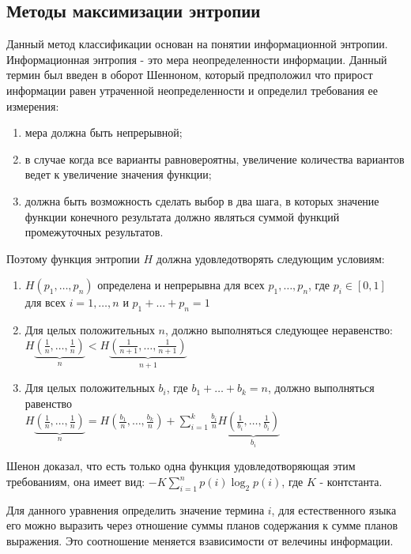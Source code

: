 \documentclass{standalone}
\begin{document}
\subsection{Методы максимизации энтропии} %
\par Данный метод классификации основан на понятии информационной энтропии. Информационная энтропия - это мера неопределенности информации. Данный термин был введен в оборот Шенноном, который предположил что прирост информации равен утраченной неопределенности и определил требования ее измерения:
\begin{enumerate}
    \item мера должна быть непрерывной;
    \item в случае когда все варианты равновероятны, увеличение количества вариантов ведет к увеличение значения функции;
    \item должна быть возможность сделать выбор в два шага, в которых значение функции конечного результата должно являться суммой функций промежуточных результатов.
\end{enumerate}
\par Поэтому функция энтропии \(H\) должна удовледотворять следующим условиям:
\begin{enumerate}
    \item \(H(p_{1},\ldots,p_{n})\) определена и непрерывна для всех \(p_{1},\ldots,p_{n}\), где \(p_{i}\in [0,1]\) для всех \(i=1,\ldots,n\) и \(p_{1}+\ldots +p_{n}=1\)
    \item Для целых положительных \(n\), должно выполняться следующее неравенство:
        \(H\underbrace {\left({\frac {1}{n}},\ldots,{\frac {1}{n}}\right)} _{n}<H\underbrace {\left({\frac {1}{n+1}},\ldots,{\frac {1}{n+1}}\right)} _{n+1}\)
    \item Для целых положительных \(b_{i}\), где \(b_{1}+\ldots+b_{k}=n\), должно выполняться равенство \\
        \(H\underbrace {\left({\frac {1}{n}},\ldots,{\frac {1}{n}}\right)} _{n}=H\left({\frac {b_{1}}{n}},\ldots ,{\frac {b_{k}}{n}}\right)+\sum _{i=1}^{k}{\frac {b_{i}}{n}}H\underbrace {\left({\frac {1}{b_{i}}},\ldots,{\frac {1}{b_{i}}}\right)} _{b_{i}}\)
\end{enumerate}
\par Шенон доказал, что есть только одна функция удовледотворяющая этим требованиям, она имеет вид:
\(-K\sum _{{i=1}}^{n}p(i)\log _{2}p(i)\),
где \(K\) - контстанта.
\par Для данного уравнения определить значение термина \(i\), для естественного языка его можно выразить через отношение суммы планов содержания к сумме планов выражения. Это соотношение меняется взависимости от велечины информации.
\end{document}
